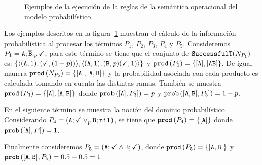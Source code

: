 \begin{figure}[h]
\begin{minipage}{0.30\hsize}
{
}
\end{minipage}
\linefigure

\caption{Ejemplos de la ejecución de la reglas de la semántica operacional del modelo probabilístico.\label{example:op}}
\end{figure}

Los ejemplos descritos en la figura~\ref{example:op} muestran el
cálculo de la información probabilística al procesar los términos $P_1$, $P_2$, $P_3$, $P_4$ y $P_5$.
Consideremos $P_1=\mathtt{A};\overline{\mathtt{B}};_{p}\checkmark$,
para este término se tiene que el conjunto de $\mathtt{SuccessfulT}(N_{P_1})$ es: $\{\langle (\mathtt{A},1),(\checkmark,(1-p))\rangle,\langle(\mathtt{A},1),(\mathtt{B},p)(\checkmark,1)\rangle\}$
y $\mathtt{prod}\left(P_1\right)=\{[\mathtt{A}],[\mathtt{A}\mathtt{B}]\}$.
De igual manera $\mathtt{prod}\left(N_{P_2}\right)=\{[\mathtt{A}],[\mathtt{A},\mathtt{B}]\}$ y la probabilidad
asociada con cada producto es calculada tomando en cuenta las distintas ramas.
También se muestra $\mathtt{prod}\left(P_3\right)=\{[\mathtt{A}],[\mathtt{A},\mathtt{B}] \}$
donde $\mathtt{prob}\left([\mathtt{A}],P_3]\right)=p$ y $\mathtt{prob}\left([\mathtt{A},\mathtt{B}],P_3]\right)=1-p$.

En el siguiente término se muestra la noción del dominio probabilístico.
Considerando $P_4=(\mathtt{A};\checkmark \mathbin{\lor}_{p} \mathtt{B};\mathtt{nil})$,
se tiene que $\mathtt{prod}\left(P_4\right)=\{[\mathtt{A}]\}$
donde $\mathtt{prob}\left([\mathtt{A}],P]\right)=1$.

Finalmente consideremos $P_5=(\mathtt{A};\checkmark \mathbin{\wedge} \mathtt{B};\checkmark)$,
donde $\mathtt{prod}\left(P_5\right)=\{[\mathtt{A},\mathtt{B}]\}$ y 
 $\mathtt{prob}\left([\mathtt{A},\mathtt{B}],P_5\right)= 0.5+0.5=1$.




